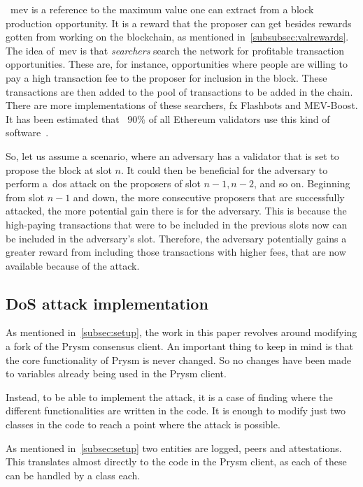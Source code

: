 ~\gls{mev} is a reference to the maximum value one can extract from a block production opportunity.
It is a reward that the proposer can get besides rewards gotten from working on the blockchain,
as mentioned in~\autoref{subsubsec:valrewards}.
The idea of~\gls{mev} is that \textit{searchers} search the network for profitable transaction opportunities.
These are, for instance,
opportunities where people are willing to pay a high transaction fee to the proposer for inclusion in the block.
These transactions are then added to the pool of transactions to be added in the chain.
There are more implementations of these searchers, fx Flashbots and MEV-Boost.
It has been estimated that ~90\% of all Ethereum validators use this kind of software~\cite{cryptoeprint:2023/760}.

So, let us assume a scenario, where an adversary has a validator that is set to propose the block at slot $n$.
It could then be beneficial for the adversary to perform a~\gls{dos} attack on the proposers of slot $n-1, n-2$,
and so on.
Beginning from slot $n-1$ and down, the more consecutive proposers that are successfully attacked,
the more potential gain there is for the adversary.
This is
because the high-paying transactions
that were to be included in the previous slots now can be included in the adversary's slot.
Therefore, the adversary potentially gains a greater reward from including those transactions with higher fees,
that are now available because of the attack.

\subsection{DoS attack implementation}\label{subsec:attack-implementation}
As mentioned in~\autoref{subsec:setup},
the work in this paper revolves around modifying a fork of the Prysm consensus client.
An important thing to keep in mind is that the core functionality of Prysm is never changed.
So no changes have been made to variables already being used in the Prysm client.

Instead, to be able to implement the attack,
it is a case of finding where the different functionalities are written in the code.
It is enough to modify just two classes in the code to reach a point where the attack is possible.

As mentioned in~\autoref{subsec:setup} two entities are logged, peers and attestations.
This translates almost directly to the code in the Prysm client, as each of these can be handled by a class each.

